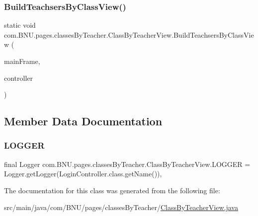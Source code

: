 \subsubsection{\texorpdfstring{Build\+Teachsers\+By\+Class\+View()}{BuildTeachsersByClassView()}}
{\footnotesize\ttfamily static void com.\+B\+N\+U.\+pages.\+classes\+By\+Teacher.\+Class\+By\+Teacher\+View.\+Build\+Teachsers\+By\+Class\+View (\begin{DoxyParamCaption}\item[{J\+Frame}]{main\+Frame,  }\item[{\mbox{\hyperlink{classcom_1_1_b_n_u_1_1pages_1_1classes_by_teacher_1_1_class_by_teacher_controller}{Class\+By\+Teacher\+Controller}}}]{controller }\end{DoxyParamCaption})\hspace{0.3cm}{\ttfamily [static]}}



\subsection{Member Data Documentation}
\mbox{\label{classcom_1_1_b_n_u_1_1pages_1_1classes_by_teacher_1_1_class_by_teacher_view_a3d7442b144bc4f8bad48ee8080907d7d}} 
\subsubsection{\texorpdfstring{L\+O\+G\+G\+ER}{LOGGER}}
{\footnotesize\ttfamily final Logger com.\+B\+N\+U.\+pages.\+classes\+By\+Teacher.\+Class\+By\+Teacher\+View.\+L\+O\+G\+G\+ER = Logger.\+get\+Logger(Login\+Controller.\+class.\+get\+Name())\hspace{0.3cm}{\ttfamily [static]}, {\ttfamily [private]}}



The documentation for this class was generated from the following file\+:\begin{DoxyCompactItemize}
\item 
src/main/java/com/\+B\+N\+U/pages/classes\+By\+Teacher/\mbox{\hyperlink{_class_by_teacher_view_8java}{Class\+By\+Teacher\+View.\+java}}\end{DoxyCompactItemize}
